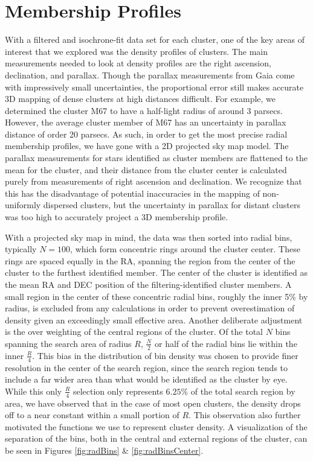 \documentclass[onecolumn,table,xcdraw,super]{aastex631}
\begin{document}
\section{Membership Profiles} \label{sec:membership}

With a filtered and isochrone-fit data set for each cluster, one of the key areas of interest that we explored was the density profiles of clusters. The main measurements needed to look at density profiles are the right ascension, declination, and parallax. Though the parallax measurements from Gaia come with impressively small uncertainties, the proportional error still makes accurate 3D mapping of dense clusters at high distances difficult. For example, we determined the cluster M67 to have a half-light radius of around 3 parsecs. However, the average cluster member of M67 has an uncertainty in parallax distance of order 20 parsecs. As such, in order to get the most precise radial membership profiles, we have gone with a 2D projected sky map model. The parallax measurements for stars identified as cluster members are flattened to the mean for the cluster, and their distance from the cluster center is calculated purely from measurements of right ascension and declination. We recognize that this has the disadvantage of potential inaccuracies in the mapping of non-uniformly dispersed clusters, but the uncertainty in parallax for distant clusters was too high to accurately project a 3D membership profile.

With a projected sky map in mind, the data was then sorted into radial bins, typically $N=100$, which form concentric rings around the cluster center. These rings are spaced equally in the RA, spanning the region from the center of the cluster to the furthest identified member. The center of the cluster is identified as the mean RA and DEC position of the filtering-identified cluster members. A small region in the center of these concentric radial bins, roughly the inner 5\% by radius, is excluded from any calculations in order to prevent overestimation of density given an exceedingly small effective area. Another deliberate adjustment is the over weighting of the central regions of the cluster. Of the total $N$ bins spanning the search area of radius $R$, $\frac{N}{2}$ or half of the radial bins lie within the inner $\frac{R}{4}$. This bias in the distribution of bin density was chosen to provide finer resolution in the center of the search region, since the search region tends to include a far wider area than what would be identified as the cluster by eye. While this only $\frac{R}{4}$ selection only represents $6.25\%$ of the total search region by area, we have observed that in the case of most open clusters, the density drops off to a near constant within a small portion of $R$. This observation also further motivated the functions we use to represent cluster density. A visualization of the separation of the bins, both in the central and external regions of the cluster, can be seen in Figures \ref{fig:radBins} \& \ref{fig:radBinsCenter}.
\end{document}

